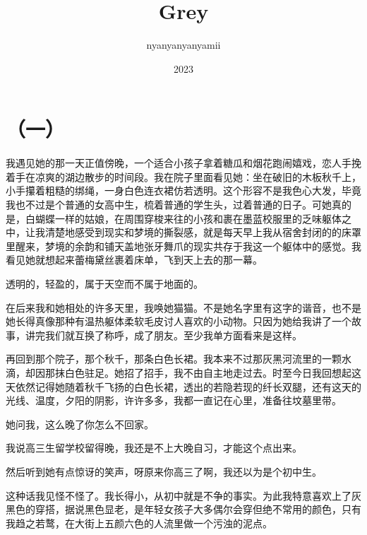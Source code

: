 \documentclass{article}
\title{Grey}
\author{nyanyanyanyamii}
\date{2023}
\begin{document}



\Large



{\centering\section*{（一）}}





我遇见她的那一天正值傍晚，一个适合小孩子拿着糖瓜和烟花跑闹嬉戏，恋人手挽着手在凉爽的湖边散步的时间段。我在院子里面看见她：坐在破旧的木板秋千上，小手攥着粗糙的绑绳，一身白色连衣裙仿若透明。这个形容不是我色心大发，毕竟我也不过是个普通的女高中生，梳着普通的学生头，过着普通的日子。可她真的是，白蝴蝶一样的姑娘，在周围穿梭来往的小孩和裹在墨蓝校服里的乏味躯体之中，让我清楚地感受到现实和梦境的撕裂感，就是每天早上我从宿舍封闭的的床罩里醒来，梦境的余韵和铺天盖地张牙舞爪的现实共存于我这一个躯体中的感觉。我看见她就想起来蕾梅黛丝裹着床单，飞到天上去的那一幕。



透明的，轻盈的，属于天空而不属于地面的。



在后来我和她相处的许多天里，我唤她猫猫。不是她名字里有这字的谐音，也不是她长得真像那种有温热躯体柔软毛皮讨人喜欢的小动物。只因为她给我讲了一个故事，讲完我们就互换了称呼，成了朋友。至少我单方面看来是这样。



再回到那个院子，那个秋千，那条白色长裙。我本来不过那灰黑河流里的一颗水滴，却因那抹白色驻足。她招了招手，我不由自主地走过去。时至今日我回想起这天依然记得她随着秋千飞扬的白色长裙，透出的若隐若现的纤长双腿，还有这天的光线、温度，夕阳的阴影，许许多多，我都一直记在心里，准备往坟墓里带。



她问我，这么晚了你怎么不回家。



我说高三生留学校留得晚，我还是不上大晚自习，才能这个点出来。



然后听到她有点惊讶的笑声，呀原来你高三了啊，我还以为是个初中生。



这种话我见怪不怪了。我长得小，从初中就是不争的事实。为此我特意喜欢上了灰黑色的穿搭，据说黑色显老，是年轻女孩子大多偶尔会穿但绝不常用的颜色，只有我趋之若鹜，在大街上五颜六色的人流里做一个污浊的泥点。
\end{document}
